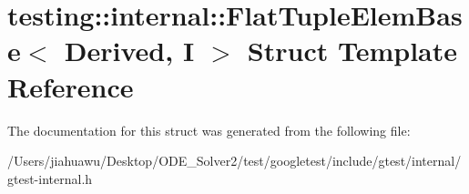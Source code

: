 \hypertarget{structtesting_1_1internal_1_1_flat_tuple_elem_base}{}\section{testing\+:\+:internal\+:\+:Flat\+Tuple\+Elem\+Base$<$ Derived, I $>$ Struct Template Reference}
\label{structtesting_1_1internal_1_1_flat_tuple_elem_base}


The documentation for this struct was generated from the following file\+:\begin{DoxyCompactItemize}
\item 
/\+Users/jiahuawu/\+Desktop/\+O\+D\+E\+\_\+\+Solver2/test/googletest/include/gtest/internal/gtest-\/internal.\+h\end{DoxyCompactItemize}
